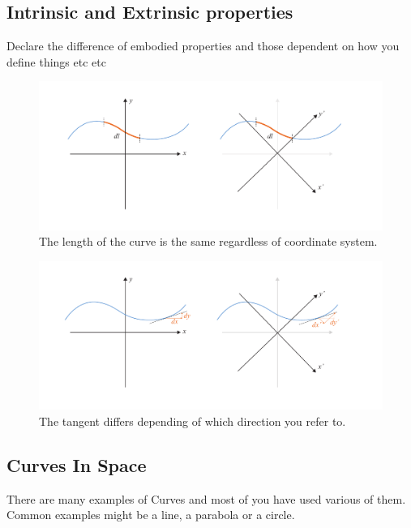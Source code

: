 \newcommand{\upperRomannumeral}[1]{\uppercase\expandafter{\romannumeral#1}}
\newcommand{\lowerromannumeral}[1]{\romannumeral#1\relax}


\subsection{Intrinsic and Extrinsic properties}

Declare the difference of embodied properties and those dependent on how you define things etc etc

\begin{figure}[H]
\centering
\includegraphics[width=0.9\linewidth ]{figure/Theory/intrisic_extrinsic2.pdf}
\caption{The length of the curve is the same regardless of coordinate system.}
\end{figure}


\begin{figure}[H]
\centering
\includegraphics[width=0.9\linewidth ]{figure/Theory/intrisic_extrinsic1.pdf}
\caption{The tangent differs depending of which direction you refer to. }
\end{figure}

\subsection{Curves In Space}
There are many examples of Curves and most of you have used various of them. Common examples might be a line, a parabola or a circle. 


